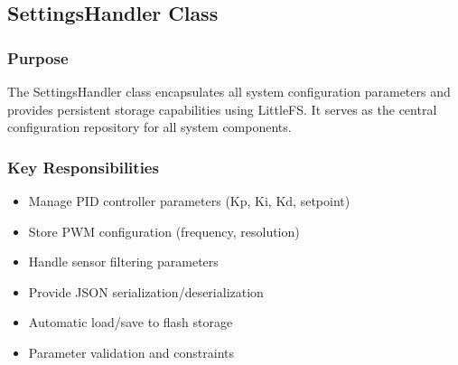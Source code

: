 \subsection{SettingsHandler Class}

\subsubsection{Purpose}
The SettingsHandler class encapsulates all system configuration parameters and provides persistent storage capabilities using LittleFS. It serves as the central configuration repository for all system components.

\subsubsection{Key Responsibilities}
\begin{itemize}
    \item Manage PID controller parameters (Kp, Ki, Kd, setpoint)
    \item Store PWM configuration (frequency, resolution)
    \item Handle sensor filtering parameters
    \item Provide JSON serialization/deserialization
    \item Automatic load/save to flash storage
    \item Parameter validation and constraints
\end{itemize}

